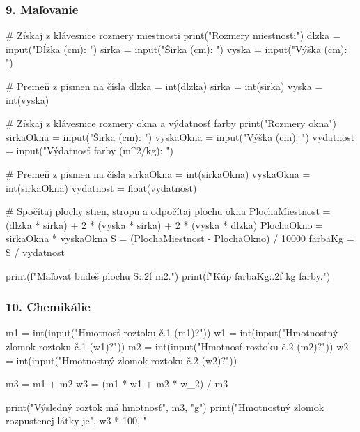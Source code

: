 \subsubsection*{9. Maľovanie}
\begin{solution}
# Získaj z klávesnice rozmery miestnosti
print("Rozmery miestnosti")
dlzka = input("Dĺžka (cm): ")
sirka = input("Širka (cm): ")
vyska = input("Výška (cm): ")

# Premeň z písmen na čísla
dlzka = int(dlzka)
sirka = int(sirka)
vyska = int(vyska)

# Získaj z klávesnice rozmery okna a výdatnosť farby
print("Rozmery okna")
sirkaOkna = input("Širka (cm): ")
vyskaOkna = input("Výška (cm): ")
vydatnost = input("Výdatnosť farby (m^2/kg): ")

# Premeň z písmen na čísla
sirkaOkna = int(sirkaOkna)
vyskaOkna = int(sirkaOkna)
vydatnost = float(vydatnost)

# Spočítaj plochy stien, stropu a odpočítaj plochu okna
PlochaMiestnost = (dlzka * sirka) + 2 * (vyska * sirka) + 2 * (vyska * dlzka)
PlochaOkno = sirkaOkna * vyskaOkna
S = (PlochaMiestnost - PlochaOkno) / 10000
farbaKg = S / vydatnost

print(f"Maľovať budeš plochu {S:.2f} m2.")
print(f"Kúp {farbaKg:.2f} kg farby.")
\end{solution}

\subsubsection*{10. Chemikálie}
\begin{solution}
m1 = int(input("Hmotnosť roztoku č.1 (m1)?"))
w1 = int(input("Hmotnostný zlomok roztoku č.1 (w1)?"))
m2 = int(input("Hmotnosť roztoku č.2 (m2)?"))
w2 = int(input("Hmotnostný zlomok roztoku č.2 (w2)?"))

m3 = m1 + m2
w3 = (m1 * w1 + m2 * w_2) / m3

print("Výsledný roztok má hmotnosť", m3, "g")
print("Hmotnostný zlomok rozpustenej látky je", w3 * 100, "%
\end{solution}

